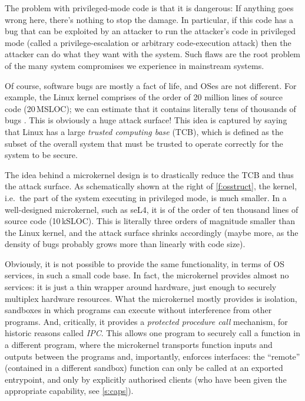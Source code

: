 \documentclass[english,a4paper,12pt\ifDraft,draft\fi]{report}
\begin{document}
  The problem with privileged-mode code is that it is dangerous: If
  anything goes wrong here, there's nothing to stop the damage. In
  particular, if this code has a bug that can be exploited by an
  attacker to run the attacker's code in privileged mode (called a
  privilege-escalation or arbitrary code-execution attack) then the
  attacker can do what they want with the system. Such flaws are the
  root problem of the many system compromises we experience in
  mainstream systems.

  Of course, software bugs are mostly a fact of life, and
  OSes are not different.  For example, the Linux kernel comprises of
  the order of 20 million lines of source code (20\,MSLOC); we can
  estimate that it contains literally tens of thousands of bugs
  \citep{Biggs_LH_18}. This is obviously a huge attack surface! This
  idea is captured by saying that Linux has a large \emph{trusted computing
    base} (TCB), which is defined as the subset of the overall system
  that must be trusted to operate correctly for the system to be
  secure.

  The idea behind a microkernel design is to drastically reduce the
  TCB and thus the
  attack surface. As schematically shown at the right of
  \autoref{f:osstruct}, the kernel, i.e.\ the part of the system
  executing in privileged mode, is much smaller. In a well-designed
  microkernel, such as seL4, it is of the order of ten thousand lines
  of source code (10\,kSLOC). This is literally three orders of
  magnitude smaller than the Linux kernel, and the attack surface shrinks
  accordingly (maybe more, as the density of bugs probably
  grows more than linearly with code size).

  Obviously, it is not possible to provide the same functionality, in
  terms of OS services, in such a small code base. In fact, the
  microkernel provides almost no services: it is just a thin wrapper
  around hardware, just enough to securely multiplex hardware
  resources. What the microkernel mostly provides is isolation,
  sandboxes in which programs can execute without interference from
  other programs. And, critically, it provides a \emph{protected
    procedure call} mechanism, for  historic reasons called
  \emph{IPC}. This allows one program to securely call a function in a
  different program, where the microkernel transports function inputs
  and outputs between the programs and, importantly, enforces
  interfaces: the ``remote'' (contained in a different sandbox)
  function can only be called at an exported entrypoint, and only by
  explicitly authorised clients (who have been given the appropriate
  capability, see \autoref{s:caps}).
\end{document}
